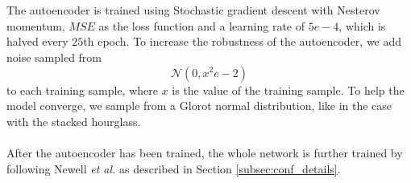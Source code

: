 \documentclass[./main.tex]{subfiles}
\begin{document}
\\
\\
The autoencoder is trained using Stochastic gradient descent with Nesterov momentum, $MSE$ as the loss function and a learning rate of $5e-4$, which is halved every $25$th epoch. To increase the robustness of the autoencoder, we add noise sampled from
$$\mathcal{N} \left(0, x^2e-2 \right)$$
to each training sample, where $x$ is the value of the training sample. To help the model converge, we sample from a Glorot normal distribution, like in the case with the stacked hourglass.
\\
\\
After the autoencoder has been trained, the whole network is further trained by following Newell \textit{et al.} \cite{Newell} as described in Section \ref{subsec:conf_details}.
\end{document}
